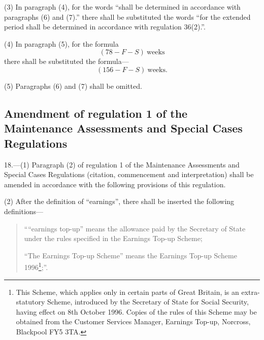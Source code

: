 \documentclass[a4paper]{article}
\begin{document}
(3) In paragraph (4), for the words “shall be determined in accordance with paragraphs (6) and (7).” there shall be substituted the words “for the extended period shall be determined in accordance with regulation 36(2).”.

(4) In paragraph (5), for the formula
\[(78-F-S) \mathrm{\ weeks}\]
there shall be substituted the formula—
\[(156-F-S) \mathrm{\ weeks.}\]

(5) Paragraphs (6) and (7) shall be omitted.

\subsection[18. Amendment of regulation 1 of the Maintenance Assessments and Special Cases Regulations]{Amendment of regulation 1 of the Maintenance Assessments and Special Cases Regulations}

18.—(1) Paragraph (2) of regulation 1 of the Maintenance Assessments and Special Cases Regulations (citation, commencement and interpretation) shall be amended in accordance with the following provisions of this regulation.

(2) After the definition of “earnings”, there shall be inserted the following definitions—
\begin{quotation}
““earnings top-up” means the allowance paid by the Secretary of State under the rules specified in the Earnings Top-up Scheme;

“The Earnings Top-up Scheme” means the Earnings Top-up Scheme 1996\footnote{\frenchspacing This Scheme, which applies only in certain parts of Great Britain, is an extra-statutory Scheme, introduced by the Secretary of State for Social Security, having effect on 8th October 1996. Copies of the rules of this Scheme may be obtained from the Customer Services Manager, Earnings Top-up, Norcross, Blackpool FY5 3TA.};”.
\end{quotation}
\end{document}
